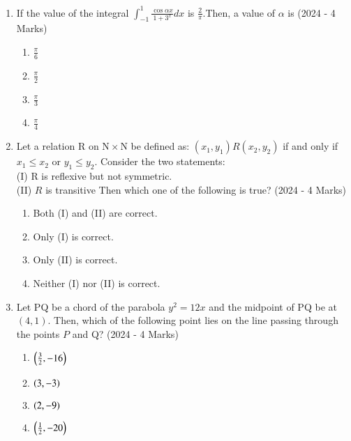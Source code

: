 \documentclass[journal]{IEEEtran}
\begin{document}
\begin{enumerate}
{		}
    \item{
          	
          	If the value of the integral $\int_{-1}^{1} \frac{\cos \alpha x}{1+3^{x}} d x$ is $\frac{2}{\pi}$.Then, a value of $\alpha$ is
             \text{ }
             \hfill
                {(2024 - 4 Marks)}
            \begin{multicols}{4}
                \begin{enumerate}
                	\item $\frac{\pi}{6}$
                	\item $\frac{\pi}{2}$
                	\item $\frac{\pi}{3}$
                	\item $\frac{\pi}{4}$
                \end{enumerate}
            \end{multicols}

        
        }
    \item{
	        
	       	Let a relation R on $\mathrm{N} \times \mathrm{N}$ be defined as:
	        $\left(x_{1}, y_{1}\right) R\left(x_{2}, y_{2}\right)$ if and only if $x_{1} \leq x_{2}$ or $y_{1} \leq y_{2}$.
	        Consider the two statements:\\
	        (I) R is reflexive but not symmetric.\\
	        (II) $R$ is transitive
	        Then which one of the following is true?
             \hfill
                {(2024 - 4 Marks)}
            \begin{multicols}{2}
                \begin{enumerate}
                	\item Both (I) and (II) are correct.
                	\item Only (I) is correct.
                	\item Only (II) is correct.
                	\item Neither (I) nor (II) is correct.
                \end{enumerate}
            \end{multicols}
        
        }
    \item{
    		
    		Let PQ be a chord of the parabola $y^{2}=12 x$ and the midpoint of PQ be at $(4,1)$. Then, which of the following point lies on the line passing through the points $P$ and Q?
             \hfill
                {(2024 - 4 Marks)}
			\begin{multicols}{4}
				\begin{enumerate}
					\item $\left(\frac{3}{2},-16\right)$
					\item $\left(3,-3\right)$
					\item $\left(2,-9\right)$
					\item $\left(\frac{1}{2},-20\right)$
				\end{enumerate}
			\end{multicols}
        
}
\end{enumerate}
\end{document}
